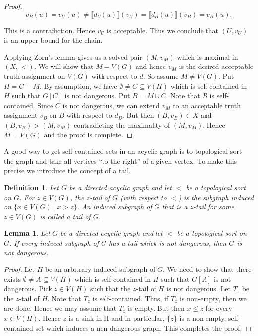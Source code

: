 \documentclass[12pt]{article}
\newtheorem{lem}[thm]{Lemma}
\newtheorem{defn}{Definition}
\theoremstyle{remark}
\begin{document}
\begin{proof}
\[v_B(u) = v_U(u) \neq \llbracket d_U(u)\rrbracket(v_U) = \llbracket d_B(u)\rrbracket(v_B) = v_B(u).\]

This is a contradiction.  Hence $v_U$ is acceptable.  Thus we conclude that $(U, v_U)$ is an upper bound for the chain.\newline

Applying Zorn's lemma gives us a solved pair $(M, v_M)$ which is maximal in $(X, <)$.  We will show that $M = V(G)$ and hence $v_M$ is the desired acceptable truth assignment on $V(G)$ with respect to $d$.  So assume $M \neq V(G)$.  Put $H = G - M$.  By assumption, we have $\emptyset \neq C \subseteq V(H)$ which is self-contained in $H$ such that $G[C]$ is not dangerous.  Put $B = M \cup C$.  Note that $B$ is self-contained.  Since $C$ is not dangerous, we can extend $v_M$ to an acceptable truth assignment $v_B$ on $B$ with respect to $d_B$.  But then $(B, v_B) \in X$ and $(B, v_B) > (M, v_M)$ contradicting the maximality of $(M, v_M)$. Hence $M = V(G)$ and the proof is complete.
\end{proof}


A good way to get self-contained sets in an acyclic graph is to topological sort the graph and take all vertices ``to the right'' of a given vertex.  To make this precise we introduce the concept of a tail.

\begin{defn}
Let $G$ be a directed acyclic graph and let $<$ be a topological sort on $G$.  For $z \in V(G)$, the $z$-tail of $G$ (with respect to $<$) is the subgraph induced on $\{x \in V(G) \mid x > z\}$.  An induced subgraph of $G$ that is a $z$-tail for some $z \in V(G)$ is called a \emph{tail} of $G$.
\end{defn}

\begin{lem}\label{TailLemma}
Let $G$ be a directed acyclic graph and let $<$ be a topological sort on $G$.  If every induced subgraph of $G$ has a tail which is not dangerous, then $G$ is not dangerous.
\end{lem}
\begin{proof}
Let $H$ be an arbitrary induced subgraph of $G$.  We need to show that there exists $\emptyset \neq A \subseteq V(H)$ which is self-contained in $H$ such that $G[A]$ is not dangerous.  Pick $z \in V(H)$ such that the $z$-tail of $H$ is not dangerous.  Let $T_z$ be the $z$-tail of $H$.  Note that $T_z$ is self-contained.  Thus, if $T_z$ is non-empty, then we are done.  Hence we may assume that $T_z$ is empty.  But then $x \leq z$ for every $x \in V(H)$.  Hence $z$ is a sink in H and in particular, $\{z\}$ is a non-empty, self-contained set which induces a non-dangerous graph.  This completes the proof.
\end{proof}
\end{document}

